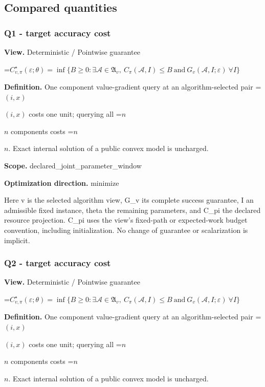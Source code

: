 \documentclass[10pt,a4paper]{article}
\newcommand{\AtlasMath}[1]{\par\begingroup\centering\setbox0=\hbox{$\displaystyle #1$}\ifdim\wd0>1.4\linewidth\typeout{ATLAS WIDE FORMULA: \the\wd0}\fi\ifdim\wd0>\linewidth\resizebox{\linewidth}{!}{\box0}\else\box0\fi\par\endgroup}
\newcommand{\AtlasInlineMath}[1]{\begingroup\setbox0=\hbox{$#1$}\ifdim\wd0>.4\linewidth\endgroup\AtlasMath{#1}\else\endgroup$#1$\fi}
\begin{document}
\subsection{Compared quantities}


\subsubsection{Q1 - target accuracy cost}


\textbf{View.} Deterministic / Pointwise guarantee



\AtlasMath{C^\star_{v,\pi}(\varepsilon;\theta)=\inf\{B\ge0:\exists\mathcal A\in\mathfrak A_v,\ C_\pi(\mathcal A,I)\le B\ \text{and}\ G_v(\mathcal A,I;\varepsilon)\ \forall I\}}


\textbf{Definition.} One component value-gradient query at an algorithm-selected pair \AtlasInlineMath{(i,x)} costs one unit; querying all \AtlasInlineMath{n} components costs \AtlasInlineMath{n}. Exact internal solution of a public convex model is uncharged.



\textbf{Scope.} declared\_joint\_parameter\_window



\textbf{Optimization direction.} minimize



Here v is the selected algorithm view, G\_v its complete success guarantee, I an admissible fixed instance, theta the remaining parameters, and C\_pi the declared resource projection. C\_pi uses the view's fixed-path or expected-work budget convention, including initialization. No change of guarantee or scalarization is implicit.



\subsubsection{Q2 - target accuracy cost}


\textbf{View.} Deterministic / Pointwise guarantee



\AtlasMath{C^\star_{v,\pi}(\varepsilon;\theta)=\inf\{B\ge0:\exists\mathcal A\in\mathfrak A_v,\ C_\pi(\mathcal A,I)\le B\ \text{and}\ G_v(\mathcal A,I;\varepsilon)\ \forall I\}}


\textbf{Definition.} One component value-gradient query at an algorithm-selected pair \AtlasInlineMath{(i,x)} costs one unit; querying all \AtlasInlineMath{n} components costs \AtlasInlineMath{n}. Exact internal solution of a public convex model is uncharged.
\end{document}
